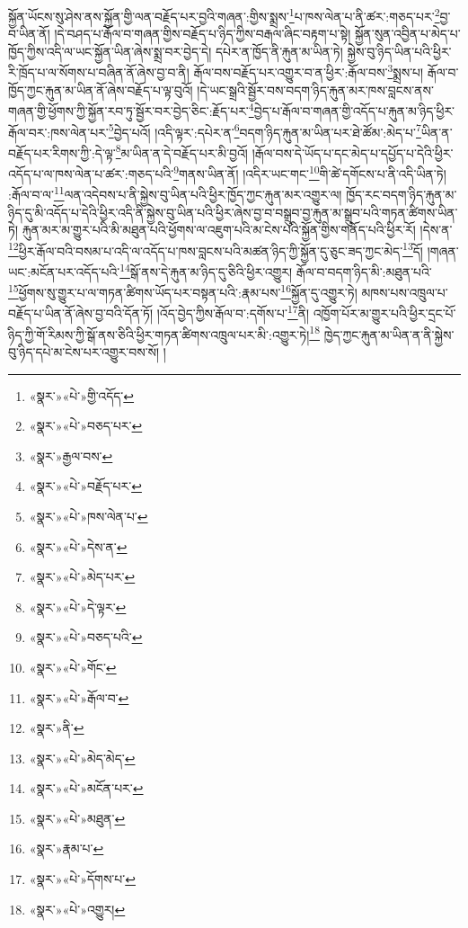 སྐྱོན་ཡོངས་སུ་ཤེས་ནས་སྐྱོན་གྱི་ལན་བརྗོད་པར་བྱའི་གཞན་:གྱིས་སྨྲས་\footnote{«སྣར་»«པེ་»གྱི་འདོད་}པ་ཁས་ལེན་པ་ནི་ཚར་:གཅད་པར་\footnote{«སྣར་»«པེ་»བཅད་པར་}བྱ་བ་ཡིན་ནོ། །དེ་བཤད་པ་རྒོལ་བ་གཞན་གྱིས་བརྗོད་པ་ཉིད་ཀྱིས་བརྒལ་ཞིང་བརྟག་པ་སྟེ། སྐྱོན་སུན་འབྱིན་པ་མེད་པ་ཁྱོད་ཀྱིས་འདི་ལ་ཡང་སྐྱོན་ཡིན་ཞེས་སྨྲ་བར་བྱེད་དེ། དཔེར་ན་ཁྱོད་ནི་རྐུན་མ་ཡིན་ཏེ། སྐྱེས་བུ་ཉིད་ཡིན་པའི་ཕྱིར་རི་ཁྲོད་པ་ལ་སོགས་པ་བཞིན་ནོ་ཞེས་བྱ་བ་ནི། རྒོལ་བས་བརྗོད་པར་འགྱུར་བ་ན་ཕྱིར་:རྒོལ་བས་\footnote{«སྣར་»རྒྱལ་བས་}སྨྲས་པ། རྒོལ་བ་ཁྱོད་ཀྱང་རྐུན་མ་ཡིན་ནོ་ཞེས་བརྗོད་པ་ལྟ་བུའོ། །དེ་ཡང་སྒྲའི་སྦྱོར་བས་བདག་ཉིད་རྐུན་མར་ཁས་བླངས་ནས་གཞན་གྱི་ཕྱོགས་ཀྱི་སྐྱོན་རབ་ཏུ་སྦྱོར་བར་བྱེད་ཅིང་:རྗོད་པར་\footnote{«སྣར་»«པེ་»བརྗོད་པར་}བྱེད་པ་རྒོལ་བ་གཞན་གྱི་འདོད་པ་རྐུན་མ་ཉིད་ཕྱིར་རྒོལ་བར་:ཁས་ལེན་པར་\footnote{«སྣར་»«པེ་»ཁས་ལེན་པ་}བྱེད་པའོ། །འདི་ལྟར་:དཔེར་ན་\footnote{«སྣར་»«པེ་»དེས་ན་}བདག་ཉིད་རྐུན་མ་ཡིན་པར་ཐེ་ཚོམ་:མེད་པ་\footnote{«སྣར་»«པེ་»མེད་པར་}ཡིན་ན་བརྗོད་པར་རིགས་ཀྱི་:དེ་ལྟ་\footnote{«སྣར་»«པེ་»དེ་ལྟར་}མ་ཡིན་ན་དེ་བརྗོད་པར་མི་བྱའོ། །རྒོལ་བས་དེ་ཡོད་པ་དང་མེད་པ་དཔྱོད་པ་དེའི་ཕྱིར་འདོད་པ་ལ་ཁས་ལེན་པ་ཚར་:གཅད་པའི་\footnote{«སྣར་»«པེ་»བཅད་པའི་}གནས་ཡིན་ནོ། །འདིར་ཡང་གང་\footnote{«སྣར་»«པེ་»གོང་}གི་ཚེ་དགོངས་པ་ནི་འདི་ཡིན་ཏེ། :རྒོལ་བ་ལ་\footnote{«སྣར་»«པེ་»རྒོལ་བ་}ལན་འདེབས་པ་ནི་སྐྱེས་བུ་ཡིན་པའི་ཕྱིར་ཁྱོད་ཀྱང་རྐུན་མར་འགྱུར་ལ། ཁྱོད་རང་བདག་ཉིད་རྐུན་མ་ཉིད་དུ་མི་འདོད་པ་དེའི་ཕྱིར་འདི་ནི་སྐྱེས་བུ་ཡིན་པའི་ཕྱིར་ཞེས་བྱ་བ་བསྒྲུབ་བྱ་རྐུན་མ་སྒྲུབ་པའི་གཏན་ཚིགས་ཡིན་ཏེ། རྐུན་མར་མ་གྱུར་པའི་མི་མཐུན་པའི་ཕྱོགས་ལ་འཇུག་པའི་མ་ངེས་པའི་སྐྱོན་གྱིས་གནོད་པའི་ཕྱིར་རོ། །དེས་ན་\footnote{«སྣར་»ནི་}ཕྱིར་རྒོལ་བའི་བསམ་པ་འདི་ལ་འདོད་པ་ཁས་བླངས་པའི་མཚན་ཉིད་ཀྱི་སྐྱོན་དུ་ཅུང་ཟད་ཀྱང་མེད་\footnote{«སྣར་»«པེ་»མེད་མེད་}དོ། །གཞན་ཡང་:མངོན་པར་འདོད་པའི་\footnote{«སྣར་»«པེ་»མངོན་པར་}སྒོ་ནས་དེ་རྐུན་མ་ཉིད་དུ་ཅིའི་ཕྱིར་འགྱུར། རྒོལ་བ་བདག་ཉིད་མི་:མཐུན་པའི་\footnote{«སྣར་»«པེ་»མཐུན་}ཕྱོགས་སུ་གྱུར་པ་ལ་གཏན་ཚིགས་ཡོད་པར་བསྟན་པའི་:རྣམ་པས་\footnote{«སྣར་»རྣམ་པ་}སྐྱོན་དུ་འགྱུར་ཏེ། མཁས་པས་འཁྲུལ་པ་བརྗོད་པ་ཡིན་ནོ་ཞེས་བྱ་བའི་དོན་ཏོ། །འོད་བྱེད་ཀྱིས་རྒོལ་བ་:དགོས་པ་\footnote{«སྣར་»«པེ་»དོགས་པ་}ནི། འཁྱོག་པོར་མ་གྱུར་པའི་ཕྱིར་དྲང་པོ་ཉིད་ཀྱི་གོ་རིམས་ཀྱི་སྒོ་ནས་ཅིའི་ཕྱིར་གཏན་ཚིགས་འཁྲུལ་པར་མི་:འགྱུར་ཏེ།\footnote{«སྣར་»«པེ་»འགྱུར།} ཁྱེད་ཀྱང་རྐུན་མ་ཡིན་ན་ནི་སྐྱེས་བུ་ཉིད་དཔེ་མ་ངེས་པར་འགྱུར་བས་སོ། །
